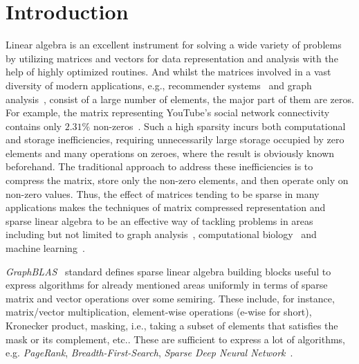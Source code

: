 \section*{Introduction}

Linear algebra is an excellent instrument for solving a wide variety of problems by utilizing matrices and vectors for data representation and analysis with the help of highly optimized routines. And whilst the matrices involved in a vast diversity of modern applications, e.g., recommender systems~\cite{amazon, gupta2020architectural} and graph analysis~\cite{graph1,graph2}, consist of a large number of elements, the major part of them are zeros. For example, the matrix representing YouTube's  social network connectivity contains only $2.31
\%$ non-zeros~\cite{leskovec2016snap}. Such a high sparsity incurs both computational and storage inefficiencies, requiring unnecessarily large storage occupied by zero elements and many operations on zeroes, where the result is obviously known beforehand. 
The traditional approach to address these inefficiencies is to compress the
matrix, store only the non-zero elements, and then operate only
on non-zero values.
Thus, the effect of matrices tending to be sparse in many applications makes the techniques of matrix compressed representation and sparse linear algebra to be an effective way of tackling problems in areas including but not limited to graph analysis~\cite{GAILLA}, computational biology~\cite{compBio} and machine learning~\cite{Kepner_2017}.

\emph{GraphBLAS}~\cite{buluc2017graphblas} standard defines sparse linear algebra building blocks useful to express algorithms for already mentioned areas uniformly in terms of sparse matrix and vector operations over some semiring.
These include, for instance, matrix/vector multiplication, element-wise operations (e-wise for short), Kronecker product, masking, i.e., taking a subset of elements that satisfies the mask or its complement, etc.. These are sufficient to express a lot of algorithms, e.g. \emph{PageRank}, \emph{Breadth-First-Search}, \emph{Sparse Deep Neural Network}~\cite{SparseDNN}.


